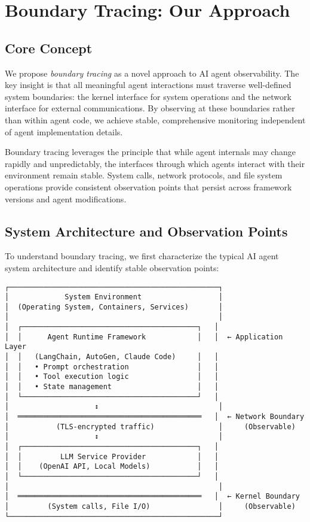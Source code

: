\documentclass[sigplan,screen，review,9pt]{acmart}
\begin{document}
\section{Boundary Tracing: Our Approach}

\subsection{Core Concept}

We propose \emph{boundary tracing} as a novel approach to AI agent observability. The key insight is that all meaningful agent interactions must traverse well-defined system boundaries: the kernel interface for system operations and the network interface for external communications. By observing at these boundaries rather than within agent code, we achieve stable, comprehensive monitoring independent of agent implementation details.

Boundary tracing leverages the principle that while agent internals may change rapidly and unpredictably, the interfaces through which agents interact with their environment remain stable. System calls, network protocols, and file system operations provide consistent observation points that persist across framework versions and agent modifications.

\subsection{System Architecture and Observation Points}

To understand boundary tracing, we first characterize the typical AI agent system architecture and identify stable observation points:

\begin{center}
\begin{Verbatim}[fontsize=\small, commandchars=\\\{\}]
┌─────────────────────────────────────────────────┐
│             System Environment                  │
│  (Operating System, Containers, Services)       │
│                                                 │
│  ┌─────────────────────────────────────────┐   │
│  │      Agent Runtime Framework            │   │  ← Application Layer
│  │   (LangChain, AutoGen, Claude Code)     │   │
│  │   • Prompt orchestration                │   │
│  │   • Tool execution logic                │   │
│  │   • State management                    │   │
│  └─────────────────────────────────────────┘   │
│                    ↕                            │
│  ═══════════════════════════════════════════   │  ← Network Boundary
│           (TLS-encrypted traffic)               │     (Observable)
│                    ↕                            │
│  ┌─────────────────────────────────────────┐   │
│  │         LLM Service Provider            │   │
│  │    (OpenAI API, Local Models)           │   │
│  └─────────────────────────────────────────┘   │
│                                                 │
│  ═══════════════════════════════════════════   │  ← Kernel Boundary
│         (System calls, File I/O)                │     (Observable)
└─────────────────────────────────────────────────┘
\end{Verbatim}
\end{center}
\end{document}
